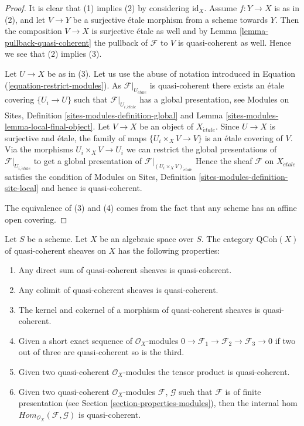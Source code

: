 \begin{proof}
It is clear that (1) implies (2) by considering $\text{id}_X$.
Assume $f : Y \to X$ is as in (2), and let $V \to Y$ be a surjective
\'etale morphism from a scheme towards $Y$. Then the composition $V \to X$ is
surjective \'etale as well
and by Lemma \ref{lemma-pullback-quasi-coherent} the pullback of $\mathcal{F}$
to $V$ is quasi-coherent as well. Hence we see that (2) implies (3).

\medskip\noindent
Let $U \to X$ be as in (3). Let us use the abuse of notation introduced
in Equation (\ref{equation-restrict-modules}).
As $\mathcal{F}|_{U_{\acute{e}tale}}$ is quasi-coherent there exists an
\'etale covering $\{U_i \to U\}$ such that
$\mathcal{F}|_{U_{i, \acute{e}tale}}$ has a global presentation, see
Modules on Sites, Definition \ref{sites-modules-definition-global} and
Lemma \ref{sites-modules-lemma-local-final-object}.
Let $V \to X$ be an object of $X_{\acute{e}tale}$. Since $U \to X$ is
surjective and \'etale, the family of maps $\{U_i \times_X V \to V\}$ is an
\'etale covering
of $V$. Via the morphisms $U_i \times_X V \to U_i$ we can restrict the
global presentations of $\mathcal{F}|_{U_{i, \acute{e}tale}}$ to get a global
presentation of $\mathcal{F}|_{(U_i \times_X V)_{\acute{e}tale}}$
Hence the sheaf $\mathcal{F}$ on $X_{\acute{e}tale}$ satisfies the condition of
Modules on Sites, Definition \ref{sites-modules-definition-site-local}
and hence is quasi-coherent.

\medskip\noindent
The equivalence of (3) and (4) comes from the fact that any scheme has
an affine open covering.
\end{proof}

\begin{lemma}
\label{lemma-properties-quasi-coherent}
Let $S$ be a scheme. Let $X$ be an algebraic space over $S$.
The category $\text{QCoh}(X)$ of quasi-coherent sheaves on $X$ has
the following properties:
\begin{enumerate}
\item Any direct sum of quasi-coherent sheaves is quasi-coherent.
\item Any colimit of quasi-coherent sheaves is quasi-coherent.
\item The kernel and cokernel of a morphism of quasi-coherent sheaves
is quasi-coherent.
\item Given a short exact sequence of $\mathcal{O}_X$-modules
$0 \to \mathcal{F}_1 \to \mathcal{F}_2 \to \mathcal{F}_3 \to 0$
if two out of three are quasi-coherent so is the third.
\item Given two quasi-coherent $\mathcal{O}_X$-modules
the tensor product is quasi-coherent.
\item Given two quasi-coherent $\mathcal{O}_X$-modules
$\mathcal{F}$, $\mathcal{G}$ such that $\mathcal{F}$
is of finite presentation (see
Section \ref{section-properties-modules}),
then the internal hom
$\textit{Hom}_{\mathcal{O}_X}(\mathcal{F}, \mathcal{G})$
is quasi-coherent.
\end{enumerate}
\end{lemma}

